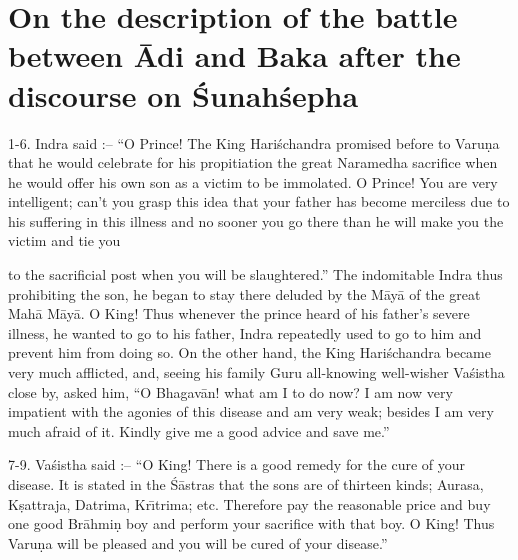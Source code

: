 \chapter{On the description of the battle between \=Adi and Baka after the discourse on \'Sunah\'sepha}

1-6. Indra said :-- ``O Prince! The King Hari\'schandra promised before to Varu\d{n}a that he would celebrate for his propitiation the great Naramedha sacrifice when he would offer his own son as a victim to be immolated. O Prince! You are very intelligent; can't you grasp this idea that your father has become merciless due to his suffering in this illness and no sooner you go there than he will make you the victim and tie you

to the sacrificial post when you will be slaughtered.'' The indomitable Indra thus prohibiting the son, he began to stay there deluded by the M\=ay\=a of the great Mah\=a M\=ay\=a. O King! Thus whenever the prince heard of his father's severe illness, he wanted to go to his father, Indra repeatedly used to go to him and prevent him from doing so. On the other hand, the King Hari\'schandra became very much afflicted, and, seeing his family Guru all-knowing well-wisher Va\'sistha close by, asked him, ``O Bhagav\=an! what am I to do now? I am now very impatient with the agonies of this disease and am very weak; besides I am very much afraid of it. Kindly give me a good advice and save me.''

7-9. Va\'sistha said :-- ``O King! There is a good remedy for the cure of your disease. It is stated in the \'S\=astras that the sons are of thirteen kinds; Aurasa, K\d{s}attraja, Datrima, Kr\={\i}trima; etc. Therefore pay the reasonable price and buy one good Br\=ahmi\d{n} boy and perform your sacrifice with that boy. O King! Thus Varu\d{n}a will be pleased and you will be cured of your disease.''

